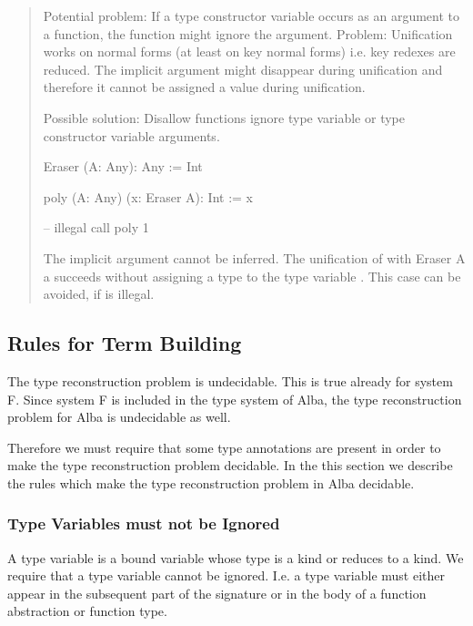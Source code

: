 \begin{quote}
    Potential problem: If a type constructor variable occurs as an argument to a
    function, the function might ignore the argument. Problem: Unification works
    on normal forms (at least on key normal forms) i.e. key redexes are reduced.
    The implicit argument might disappear during unification and therefore it
    cannot be assigned a value during unification.

    Possible solution: Disallow functions ignore type variable or type
    constructor variable arguments.

    \begin{alba}
        Eraser (A: Any): Any := Int

        poly (A: Any) (x: Eraser A): Int := x

        -- illegal call
        poly 1
    \end{alba}

    The implicit argument  cannot be inferred. The unification of
     with {Eraser A} a succeeds without assigning a type to the type
    variable . This case can be avoided, if  is illegal.

\end{quote}



\vskip 5mm
\subsection{Rules for Term Building}

The type reconstruction problem is undecidable. This is true already for system
F. Since system F is included in the type system of Alba, the type
reconstruction problem for Alba is undecidable as well.

Therefore we must require that some type annotations are present in order to
make the type reconstruction problem decidable. In the this section we describe
the rules which make the type reconstruction problem in Alba decidable.



\subsubsection{Type Variables must not be Ignored}

A type variable is a bound variable whose type is a kind or reduces to a kind.
We require that a type variable cannot be ignored. I.e. a type variable must
either appear in the subsequent part of the signature or in the body of a
function abstraction or function type.

